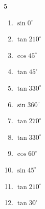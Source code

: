\begin{multicols}{5}
\begin{enumerate}
        \phantom{$\displaystyle なし$}

  \item $\displaystyle \sin{0^\circ}$

        \phantom{$\displaystyle =0$}

  \item $\displaystyle \tan{210^\circ}$


  \item $\displaystyle \cos{45^\circ}$


  \item $\displaystyle \tan{45^\circ}$

        \phantom{$\displaystyle =1$}

  \item $\displaystyle \tan{330^\circ}$


  \item $\displaystyle \sin{360^\circ}$

        \phantom{$\displaystyle =0$}

  \item $\displaystyle \tan{270^\circ}$

        \phantom{$\displaystyle なし$}

  \item $\displaystyle \tan{330^\circ}$


  \item $\displaystyle \cos{60^\circ}$


\columnbreak %

  \item $\displaystyle \sin{45^\circ}$


  \item $\displaystyle \tan{210^\circ}$


  \item $\displaystyle \tan{30^\circ}$



\end{enumerate}
\end{multicols}
